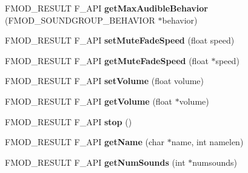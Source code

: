 \begin{DoxyCompactItemize}
\item 
\hypertarget{class_f_m_o_d_1_1_sound_group_a9da1bb7047b20c8195916518a6bed57b}{F\+M\+O\+D\+\_\+\+R\+E\+S\+U\+L\+T F\+\_\+\+A\+P\+I {\bfseries get\+Max\+Audible\+Behavior} (F\+M\+O\+D\+\_\+\+S\+O\+U\+N\+D\+G\+R\+O\+U\+P\+\_\+\+B\+E\+H\+A\+V\+I\+O\+R $\ast$behavior)}\label{class_f_m_o_d_1_1_sound_group_a9da1bb7047b20c8195916518a6bed57b}

\item 
\hypertarget{class_f_m_o_d_1_1_sound_group_a12f1961024de5e1e4998efe69d01a772}{F\+M\+O\+D\+\_\+\+R\+E\+S\+U\+L\+T F\+\_\+\+A\+P\+I {\bfseries set\+Mute\+Fade\+Speed} (float speed)}\label{class_f_m_o_d_1_1_sound_group_a12f1961024de5e1e4998efe69d01a772}

\item 
\hypertarget{class_f_m_o_d_1_1_sound_group_aca310a25104400a3eb2988db655fe606}{F\+M\+O\+D\+\_\+\+R\+E\+S\+U\+L\+T F\+\_\+\+A\+P\+I {\bfseries get\+Mute\+Fade\+Speed} (float $\ast$speed)}\label{class_f_m_o_d_1_1_sound_group_aca310a25104400a3eb2988db655fe606}

\item 
\hypertarget{class_f_m_o_d_1_1_sound_group_a62bdee90b0493d4c881e6f34c7a7389d}{F\+M\+O\+D\+\_\+\+R\+E\+S\+U\+L\+T F\+\_\+\+A\+P\+I {\bfseries set\+Volume} (float volume)}\label{class_f_m_o_d_1_1_sound_group_a62bdee90b0493d4c881e6f34c7a7389d}

\item 
\hypertarget{class_f_m_o_d_1_1_sound_group_a72cf877fa4dbc446c3b53afd84a93029}{F\+M\+O\+D\+\_\+\+R\+E\+S\+U\+L\+T F\+\_\+\+A\+P\+I {\bfseries get\+Volume} (float $\ast$volume)}\label{class_f_m_o_d_1_1_sound_group_a72cf877fa4dbc446c3b53afd84a93029}

\item 
\hypertarget{class_f_m_o_d_1_1_sound_group_a65f4d4a04d2f916c6287c185a2851746}{F\+M\+O\+D\+\_\+\+R\+E\+S\+U\+L\+T F\+\_\+\+A\+P\+I {\bfseries stop} ()}\label{class_f_m_o_d_1_1_sound_group_a65f4d4a04d2f916c6287c185a2851746}

\item 
\hypertarget{class_f_m_o_d_1_1_sound_group_a3c1c4fa4a6fc7f7e688769ce594ccb1d}{F\+M\+O\+D\+\_\+\+R\+E\+S\+U\+L\+T F\+\_\+\+A\+P\+I {\bfseries get\+Name} (char $\ast$name, int namelen)}\label{class_f_m_o_d_1_1_sound_group_a3c1c4fa4a6fc7f7e688769ce594ccb1d}

\item 
\hypertarget{class_f_m_o_d_1_1_sound_group_a48023bf29e1891b69ddc350b34db8c9b}{F\+M\+O\+D\+\_\+\+R\+E\+S\+U\+L\+T F\+\_\+\+A\+P\+I {\bfseries get\+Num\+Sounds} (int $\ast$numsounds)}\label{class_f_m_o_d_1_1_sound_group_a48023bf29e1891b69ddc350b34db8c9b}


\end{DoxyCompactItemize}
